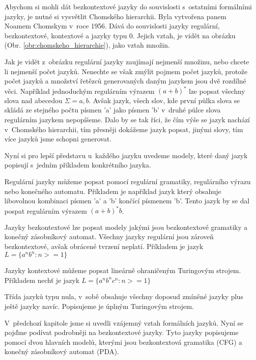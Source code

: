 Abychom si mohli dát bezkontextové jazyky do souvislosti s~ostatními formálními jazyky, je nutné si vysvětlit Chomského hierarchii. Byla vytvořena panem Noamem Chomskym v~roce 1956. Dává do souvislosti jazyky regulární, bezkontextové, kontextové a jazyky typu 0. Jejich vztah, je vidět na obrázku (Obr. \ref{obr:chomskeho_hierarchie}), jako vztah množin.


Jak je vidět z~obrázku regulární jazyky zaujímají nejmenší množinu, nebo chcete li nejmenší počet jazyků. Nenechte se však zmýlit pojmem  počet jazyků, protože počet jazyků a množství řetězců generovaných daným jazykem jsou dvě rozdílné věci. Například jednoduchým regulárním výrazem \( (a + b)^* \) lze popsat všechny slova nad abecedou \( \Sigma = {a, b} \). Avšak jazyk, všech slov, kde první půlka slova se skládá ze stejného počtu písmen 'a' jako písmen 'b' v~druhé půlce slova regulárním jazykem nepopíšeme. Dalo by se tak říci, že čím výše se jazyk nachází v~Chomského hierarchii, tím přesněji dokážeme jazyk popsat, jinými slovy, tím více jazyků jsme schopni generovat.

Nyní si pro lepší představu u~každého jazyku uvedeme modely, které daný jazyk popisují s~jedním příkladem konkrétního jazyka.

Regulární jazyky můžeme popsat pomocí regulární gramatiky, regulárního výrazu nebo konečného automatu. Příkladem je například jazyk který obsahuje libovolnou kombinaci písmen 'a' a 'b' končící písmenem 'b'. Tento jazyk by se dal pospat regulárním výrazem \( (a + b)^* b \). 

Jazyky bezkontextové lze popsat modely jakými jsou bezkontextové gramatiky a konečný zásobníkový automat. Všechny jazyky regulární jsou zároveň bezkontextové, avšak obrácené tvrzení neplatí. Příkladem je jazyk \( L = \{ a^n b^n : n >= 1 \}  \)

Jazyky kontextové můžeme popsat lineárně ohraničeným Turingovým strojem. Příkladem nechť je jazyk \( L = \{ a^n b^n c^n : n >= 1 \}  \)

Třída jazyků typu nula, v~sobě obsahuje všechny doposud zmíněné jazyky plus ještě jazyky navíc. Popisujeme je úplným Turingovým strojem. 
\cite{Chomsky_hierarchy}

V~předchozí kapitole jsme si uvedli vzájemný vztah formálních jazyků. Nyní se pojďme podívat podrobněji na bezkontextové jazyky. Tyto jazyky popisujeme pomocí dvou hlavních modelů, kterými jsou bezkontextová gramatika (CFG) a konečný zásobníkový automat (PDA).

